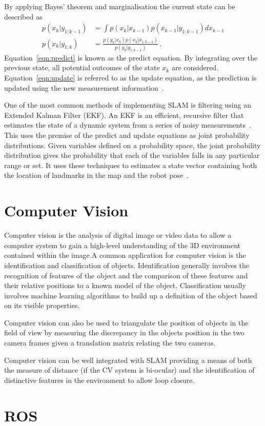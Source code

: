 By applying Bayes' theorem and marginalisation the current state can be described as
\begin{align}
\label{eqn:predict}
p(x_{k} | y_{1:k-1}) & = \int p(x_{k}|x_{k-1}) p(x_{k-1} | y_{1:k-1}) dx_{k-1} \\
\label{eqn:update}
p(x_{k} | y_{1:k}) &= \frac{ p(y_{k}|x_{k})p(x_{k}|x_{1:k-1})}{ p(y_{k}|y_{1:k-1})}\,.
\end{align}
Equation~\ref{eqn:predict} is known as the predict equation. By integrating over
the previous state, all potential outcomes of the state $x_k$ are
considered. Equation~\ref{eqn:update} is referred to as the update equation,
as the prediction is updated using the new measurement information~\cite{kam1997sensorfusion}.

One of the most common methods of implementing SLAM is filtering using an
Extended Kalman Filter (EKF). An EKF is an efficient, recursive filter
that estimates the state of a dynamic system from a series of noisy measurements~\cite{fox2003bayesian}.
This uses the premise of the predict and update equations as joint probability
distributions. Given variables defined on a probability space, the joint
probability distribution gives the probability that each of the variables falls in any
particular range or set. It uses these techniques to estimates a state vector containing
both the location of landmarks in the map and the robot pose~\cite{huang2007convergence}.


\section{Computer Vision}\label{litreview/cv}
Computer vision is the analysis of digital image or video data to allow a computer
system to gain a high-level understanding of the 3D environment contained within
the image\cite{CVBallard}.A common application for computer vision is the identification and classification
of objects. Identification generally involves the recognition of features of the
object and the comparison of these features and their relative positions to a
known model of the object. Classification usually involves machine learning
algorithms to build up a definition of the object based on its visible properties\cite{CVpaoletti2018new}.

Computer vision can also be used to triangulate the position of objects in the
field of view by measuring the discrepancy in the objects position in the two camera
frames given a translation matrix relating the two cameras.

Computer vision can be well integrated with SLAM providing a means of both the measure
of distance (if the CV system is bi-ocular) and the identification of distinctive
features in the environment to allow loop closure\cite{CVho2006loop}.

\section{ROS}\label{litreview/ROS}


